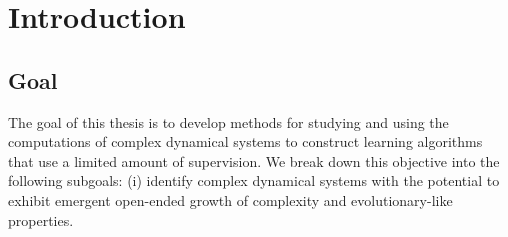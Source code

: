 \chapter{Introduction}


\section{Goal}

The goal of this thesis is to develop methods for studying and using the
computations of complex dynamical systems to construct learning algorithms that
use a limited amount of supervision. We break down this objective into the
following subgoals: (i) identify complex dynamical systems with the potential to
exhibit emergent open-ended growth of complexity and evolutionary-like
properties.
